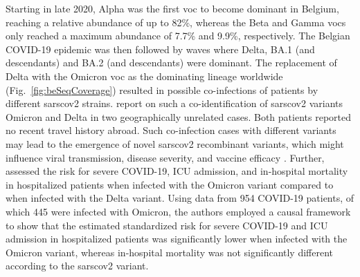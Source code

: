 Starting in late 2020, Alpha was the first \gls{voc} to become dominant in Belgium, reaching a relative abundance of up to 82\%, whereas the Beta and Gamma \gls{voc}s only reached a maximum abundance of 7.7\% and 9.9\%, respectively.
The Belgian COVID-19 epidemic was then followed by waves where Delta, BA.1 (and descendants) and BA.2 (and descendants) were dominant.
The replacement of Delta with the Omicron \gls{voc} as the dominating lineage worldwide (Fig.~\ref{fig:beSeqCoverage}) resulted in possible co-infections of patients by different \gls{sarscov2} strains.
\citet{wawina-bokalanga2022genomic} report on such a co-identification of \gls{sarscov2} variants Omicron and Delta in two geographically unrelated cases.
Both patients reported no recent travel history abroad.
Such co-infection cases with different variants may lead to the emergence of novel \gls{sarscov2} recombinant variants, which might influence viral transmission, disease severity, and vaccine efficacy \citep{rehman2020evolutionary}.
Further, \citet{vangoethem2022clinical} assessed the risk for severe COVID-19, ICU admission, and in-hospital mortality in hospitalized patients when infected with the Omicron variant compared to when infected with the Delta variant.
Using data from 954 COVID-19 patients, of which 445 were infected with Omicron, the authors employed a causal framework to show that the estimated standardized risk for severe COVID-19 and ICU admission in hospitalized patients was significantly lower when infected with the Omicron variant, whereas in-hospital mortality was not significantly different according to the \gls{sarscov2} variant.


